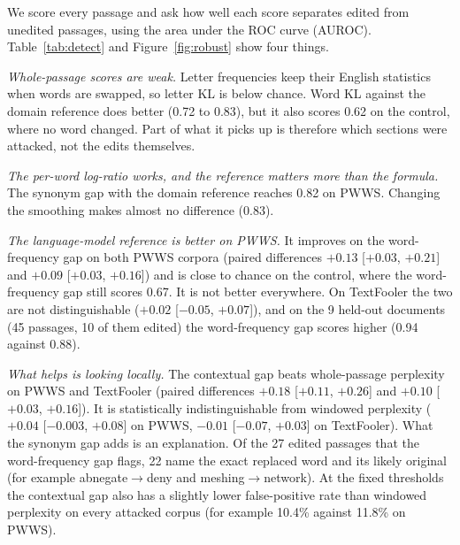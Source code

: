 \documentclass[10pt,journal,compsoc]{IEEEtran}
\begin{document}
We score every passage and ask how well each score separates edited from unedited passages, using the area under the ROC curve (AUROC). Table~\ref{tab:detect} and Figure~\ref{fig:robust} show four things.

\emph{Whole-passage scores are weak.} Letter frequencies keep their English statistics when words are swapped, so letter KL is below chance. Word KL against the domain reference does better (0.72 to 0.83), but it also scores 0.62 on the control, where no word changed. Part of what it picks up is therefore which sections were attacked, not the edits themselves.

\emph{The per-word log-ratio works, and the reference matters more than the formula.} The synonym gap with the domain reference reaches 0.82 on PWWS. Changing the smoothing makes almost no difference (0.83).

\emph{The language-model reference is better on PWWS.} It improves on the word-frequency gap on both PWWS corpora (paired differences $+0.13$ [$+0.03$, $+0.21$] and $+0.09$ [$+0.03$, $+0.16$]) and is close to chance on the control, where the word-frequency gap still scores 0.67. It is not better everywhere. On TextFooler the two are not distinguishable ($+0.02$ [$-0.05$, $+0.07$]), and on the 9 held-out documents (45 passages, 10 of them edited) the word-frequency gap scores higher (0.94 against 0.88).

\emph{What helps is looking locally.} The contextual gap beats whole-passage perplexity on PWWS and TextFooler (paired differences $+0.18$ [$+0.11$, $+0.26$] and $+0.10$ [$+0.03$, $+0.16$]). It is statistically indistinguishable from windowed perplexity ($+0.04$ [$-0.003$, $+0.08$] on PWWS, $-0.01$ [$-0.07$, $+0.03$] on TextFooler). What the synonym gap adds is an explanation. Of the 27 edited passages that the word-frequency gap flags, 22 name the exact replaced word and its likely original (for example abnegate$\to$deny and meshing$\to$network). At the fixed thresholds the contextual gap also has a slightly lower false-positive rate than windowed perplexity on every attacked corpus (for example 10.4\% against 11.8\% on PWWS).
\end{document}
